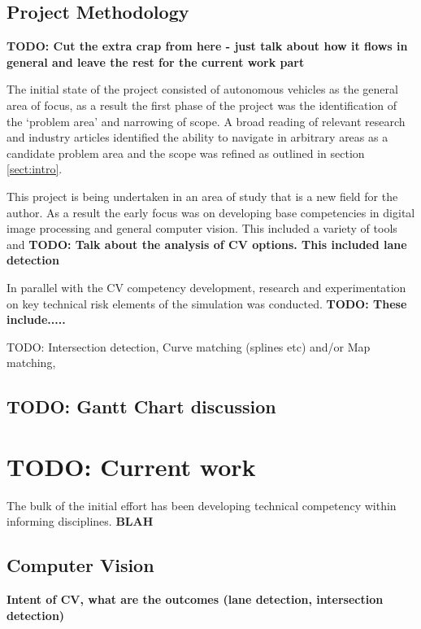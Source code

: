 \documentclass[]{aiaa-tc}%
\begin{document}
\subsection{Project Methodology}
\textbf{TODO: Cut the extra crap from here - just talk about how it flows in general and leave the rest for the current work part}

The initial state of the project consisted of autonomous vehicles as the general area of focus, as a result the first phase of the project was the identification of the `problem area' and narrowing of scope. A broad reading of relevant research and industry articles identified the ability to navigate in arbitrary areas as a candidate problem area and the scope was refined as outlined in section \ref{sect:intro}. 

This project is being undertaken in an area of study that is a new field for the author. As a result the early focus was on developing base competencies in digital image processing and general computer vision. This included a variety of tools and \textbf{TODO: Talk about the analysis of CV options. This included lane detection}

In parallel with the CV competency development, research and experimentation on key technical risk elements of the simulation was conducted. \textbf{TODO: These include.....}

TODO:  Intersection detection, Curve matching (splines etc) and/or Map matching, 

\subsection{TODO: Gantt Chart discussion}

\section{TODO: Current work}

The bulk of the initial effort has been developing technical competency within informing disciplines. \textbf{BLAH}

\subsection{Computer Vision}

\textbf{Intent of CV, what are the outcomes (lane detection, intersection detection)}
\end{document}
